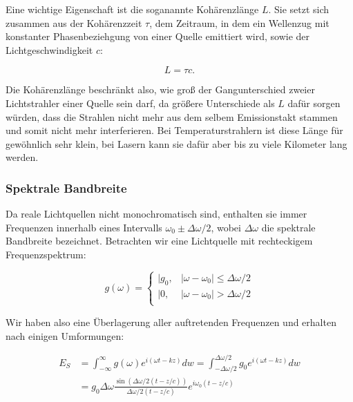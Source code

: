 \documentclass{article}
\begin{document}
Eine wichtige Eigenschaft ist die soganannte Kohärenzlänge $L$. Sie setzt sich zusammen aus der Kohärenzzeit $\tau$, dem Zeitraum, in dem ein Wellenzug mit konstanter Phasenbeziehgung von einer Quelle emittiert wird, sowie der Lichtgeschwindigkeit $c$:

\begin{equation}
    L = \tau c.
\end{equation}

Die Kohärenzlänge beschränkt also, wie groß der Gangunterschied zweier Lichtstrahler einer Quelle sein darf, da größere Unterschiede als $L$ dafür sorgen würden, dass die Strahlen nicht mehr aus dem selbem Emissionstakt stammen und somit nicht mehr interferieren. Bei Temperaturstrahlern ist diese Länge für gewöhnlich sehr klein, bei Lasern kann sie dafür aber bis zu viele Kilometer lang werden.


\subsubsection{Spektrale Bandbreite}

Da reale Lichtquellen nicht monochromatisch sind, enthalten sie immer Frequenzen innerhalb eines Intervalls $\omega_0 \pm \Delta \omega /2$, wobei $\Delta \omega$ die spektrale Bandbreite bezeichnet. Betrachten wir eine Lichtquelle mit rechteckigem Frequenzspektrum:

\begin{equation}
    g(\omega) =
    \begin{cases} 
    \vert g_0 , & |\omega - \omega_0| \leq \Delta \omega / 2 \\
    \vert 0 , & |\omega - \omega_0| > \Delta \omega / 2 \\
    \end{cases}
\end{equation}

Wir haben also eine Überlagerung aller auftretenden Frequenzen und erhalten nach einigen Umformungen:

\begin{equation}
    \begin{split}
        E_S &= \int_{-\infty}^\infty g(\omega) e^{i(\omega t - k z)} dw = \int_{-\Delta \omega / 2}^{\Delta \omega / 2} g_0 e^{i(\omega t - k z)} dw\\
        &= g_0 \Delta \omega \frac{\sin{\left(\Delta \omega / 2 (t - z/c) \right)}}{\Delta \omega / 2 (t - z/c)} e^{i\omega_0 (t - z/c)}
    \end{split}
\end{equation}
\end{document}
